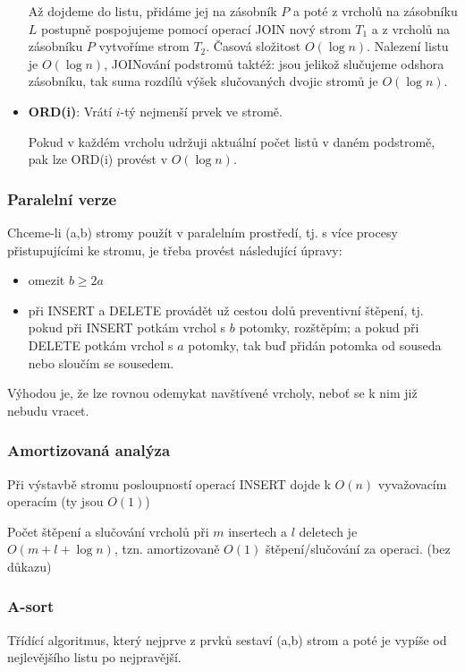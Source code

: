 \documentclass[11pt]{report} %
\numberwithin{equation}{section}
\begin{document}
\begin{itemize}
	Až dojdeme do listu, přidáme jej na zásobník $P$ a poté z vrcholů na zásobníku $L$ postupně pospojujeme pomocí operací JOIN nový strom $T_1$ a z vrcholů na zásobníku $P$ vytvoříme strom $T_2$. 
	Časová složitost $O(\log n)$. Nalezení listu je $O(\log n)$, JOINování podstromů taktéž: jsou jelikož slučujeme odshora zásobníku, tak suma rozdílů výšek slučovaných dvojic stromů je $O(\log n)$.
	
	\item \textbf{ORD(i)}:
	Vrátí $i$-tý nejmenší prvek ve stromě. 
	
	Pokud v každém vrcholu udržuji aktuální počet listů v daném podstromě, pak lze ORD(i) provést v $O(\log n)$.
	
	
\end{itemize}

\subsubsection{Paralelní verze}
Chceme-li (a,b) stromy použít v paralelním prostředí, tj. s více procesy přistupujícími ke stromu, je třeba provést následující úpravy:
\begin{itemize}
	
	
	\item omezit $b \geq 2a$
	\item při INSERT a DELETE provádět už cestou dolů preventivní štěpení, tj. pokud při INSERT potkám vrchol s $b$ potomky, rozštěpím; a pokud při DELETE potkám vrchol s $a$ potomky, tak buď přidán potomka od souseda nebo sloučím se sousedem.
\end{itemize}

Výhodou je, že lze rovnou odemykat navštívené vrcholy, neboť se k nim již nebudu vracet.

\subsubsection{Amortizovaná analýza}
Při výstavbě stromu posloupností operací INSERT dojde k $O(n)$ vyvažovacím operacím (ty jsou $O(1)$)

Počet štěpení a slučování vrcholů při $m$ insertech a $l$ deletech je $O(m + l + \log n)$, tzn. amortizovaně $O(1)$ štěpení/slučování za operaci. (bez důkazu)


\subsubsection{A-sort}
Třídící algoritmus, který nejprve z prvků sestaví (a,b) strom a poté je vypíše od nejlevějšího listu po nejpravější.
\end{document}
